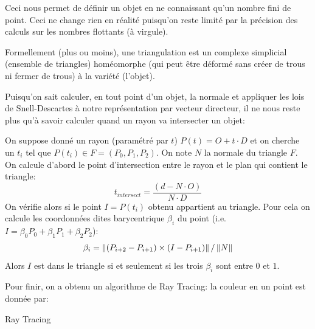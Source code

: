 \documentclass{classe}
\begin{document}
Ceci nous permet de définir un objet en ne connaissant qu'un nombre fini de point.
Ceci ne change rien en réalité puisqu'on reste limité par la précision des calculs sur les nombres flottants (à virgule).

\begin{remarque}{}{}
	Formellement (plus ou moins), une triangulation est un complexe simplicial (ensemble de triangles) homéomorphe (qui peut être déformé sans créer de trous ni fermer de trous) à la variété (l'objet).
\end{remarque}

Puisqu'on sait calculer, en tout point d'un objet, la normale et appliquer les lois de Snell-Descartes à notre représentation par vecteur directeur, il ne nous reste plus qu'à savoir calculer quand un rayon va intersecter un objet:

On suppose donné un rayon (paramétré par $t$) $P(t) = O+ t\cdot D$ et on cherche un $t_{i}$ tel que $P(t_{i}) \in F = (P_{0}, P_{1}, P_{2})$.
On note $N$ la normale du triangle $F$.
On calcule d'abord le point d'intersection entre le rayon et le plan qui contient le triangle:
\begin{equation*}
	t_{intersect} = \frac{\left(d - N\cdot O\right)}{N \cdot D}
\end{equation*}
On vérifie alors si le point $I = P(t_{i})$ obtenu appartient au triangle. Pour cela on calcule les coordonnées dites barycentrique $\beta_{i}$ du point (i.e. $I = \beta_{0}P_{0} + \beta_{1}P_{1} + \beta_{2}P_{2}$):
\begin{equation*}
	\beta_{i} = \left\lVert \left(P_{i + 2} - P_{i + 1}\right) \times \left(I - P_{i + 1}\right) \right\rVert/\left\lVert N \right\rVert
\end{equation*}
Alors $I$ est dans le triangle si et seulement si les trois $\beta_{i}$ sont entre $0$ et $1$.

Pour finir, on a obtenu un algorithme de Ray Tracing: la couleur en un point est donnée par:
\begin{algorithm}[H]
	\caption{Ray Tracing}
	\begin{algorithmic}
				\Else
				\EndIf
			\EndIf
		\EndFunction
	\end{algorithmic}
\end{algorithm}
\end{document}
